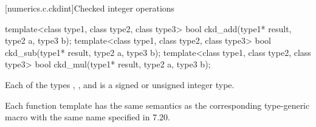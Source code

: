 \pnum
{}

[numerics.c.ckdint]{Checked integer operations}

%
%
%
\begin{itemdecl}
template<class type1, class type2, class type3>
  bool ckd_add(type1* result, type2 a, type3 b);
template<class type1, class type2, class type3>
  bool ckd_sub(type1* result, type2 a, type3 b);
template<class type1, class type2, class type3>
  bool ckd_mul(type1* result, type2 a, type3 b);
\end{itemdecl}

\begin{itemdescr}
\pnum
\mandates
Each of the types , , and  is a
signed or unsigned integer type.

\pnum
\remarks
Each function template has the same semantics as
the corresponding type-generic macro with the same name
specified in \IsoC{} 7.20.
\end{itemdescr}
